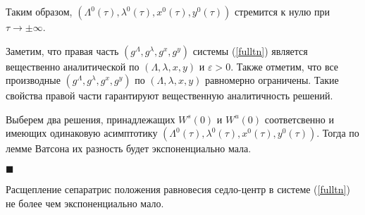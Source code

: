 Таким образом, $(\Lambda^0(\tau),\lambda^0(\tau),x^0(\tau),y^0(\tau))$ стремится к нулю при $\tau \to \pm \infty$.

Заметим, что правая часть $(g^\Lambda, g^\lambda, g^x, g^y)$ системы (\ref{fulltn}) является вещественно аналитической по $(\Lambda, \lambda, x, y)$ и $\varepsilon>0$. Также отметим, что все производные $(g^\Lambda, g^\lambda, g^x, g^y)$ по $(\Lambda, \lambda, x, y)$ равномерно ограничены. Такие свойства правой части гарантируют вещественную аналитичность решений.

Выберем два решения, принадлежащих $W^s(0)$ и $W^u(0)$ соответсвенно и имеющих одинаковую асимптотику $(\Lambda^0(\tau),\lambda^0(\tau),x^0(\tau),y^0(\tau))$. Тогда по лемме Ватсона их разность будет экспоненциально мала.


$\blacksquare$
\begin{consequence}
Расщепление сепаратрис положения равновесия седло-центр в системе (\ref{fulltn}) не более чем экспоненциально мало. 
\end{consequence}
